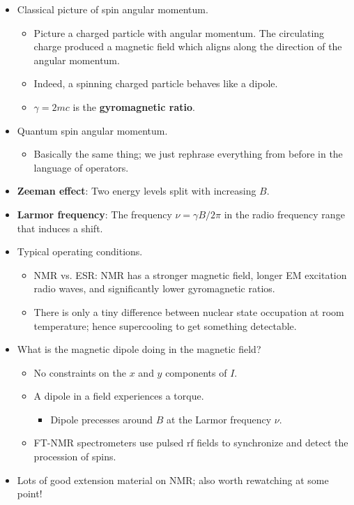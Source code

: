 \documentclass[../notes.tex]{subfiles}
\begin{document}
\begin{itemize}
\begin{itemize}
    \end{itemize}
    \item Classical picture of spin angular momentum.
    \begin{itemize}
        \item Picture a charged particle with angular momentum. The circulating charge produced a magnetic field which aligns along the direction of the angular momentum.
        \item Indeed, a spinning charged particle behaves like a dipole.
        \item $\gamma=2mc$ is the \textbf{gyromagnetic ratio}.
    \end{itemize}
    \item Quantum spin angular momentum.
    \begin{itemize}
        \item Basically the same thing; we just rephrase everything from before in the language of operators.
    \end{itemize}
    \item \textbf{Zeeman effect}: Two energy levels split with increasing $B$.
    \item \textbf{Larmor frequency}: The frequency $\nu=\gamma B/2\pi$ in the radio frequency range that induces a shift.
    \item Typical operating conditions.
    \begin{itemize}
        \item NMR vs. ESR: NMR has a stronger magnetic field, longer EM excitation radio waves, and significantly lower gyromagnetic ratios.
        \item There is only a tiny difference between nuclear state occupation at room temperature; hence supercooling to get something detectable.
    \end{itemize}
    \item What is the magnetic dipole doing in the magnetic field?
    \begin{itemize}
        \item No constraints on the $x$ and $y$ components of $I$.
        \item A dipole in a field experiences a torque.
        \begin{itemize}
            \item Dipole precesses around $B$ at the Larmor frequency $\nu$.
        \end{itemize}
        \item FT-NMR spectrometers use pulsed rf fields to synchronize and detect the procession of spins.
    \end{itemize}
    \item Lots of good extension material on NMR; also worth rewatching at some point!
\end{itemize}
\end{document}
